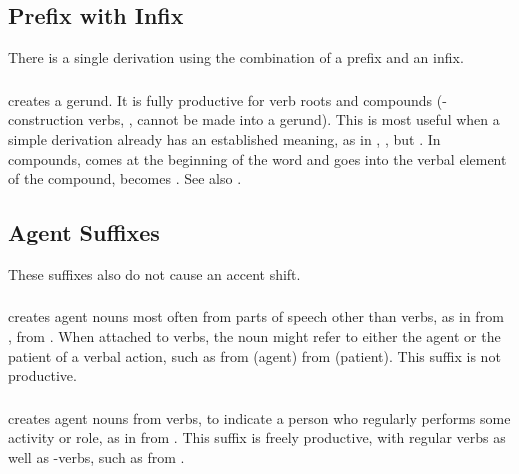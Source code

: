 \subsection{Prefix with Infix} There is a single derivation using the
combination of a prefix and an infix.

\subsubsection{}  creates a gerund.  It is fully
productive for verb roots and compounds (-con\-struc\-tion verbs,
, cannot be made into a gerund).  This is
most useful when a simple  derivation already has an
established meaning, as in  ,  ,
but  .  In compounds,  comes at the
beginning of the word and  goes into the verbal element of the
compound,  becomes . See also
.
\label{lingop:gerund}


\subsection{Agent Suffixes} These suffixes also do not cause an accent
shift.

\subsubsection{} 
 creates agent nouns most often from parts of speech other than
verbs, as in  
from  ,   from  .  When
attached to verbs, the noun might refer to either the agent or the
patient of a verbal action, such as  
from   (agent)  
from   (patient).  This suffix is not
productive.

\subsubsection{}  creates agent nouns from verbs, to indicate a
person who regularly performs some activity or role, as in
  from  .  This suffix is freely
productive, with regular verbs as well as -verbs, such
as   from  .



